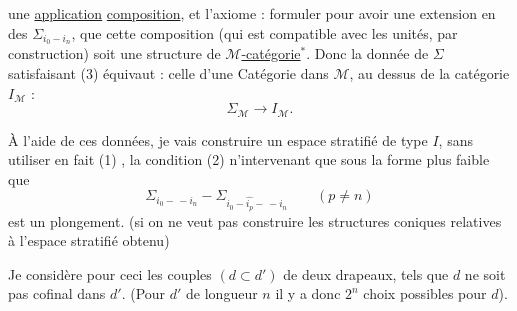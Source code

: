 une \uline{application} \uline{composition}, et l'axiome :
formuler pour avoir une extension 
en des \(\Sigma_{i_0-i_n}\),  que cette composition
(qui est compatible avec les unités, \unsure{,|)}
par construction) soit une structure de
\uline{\(\mathcal M\)-catégorie}\(^*\). 
Donc la donnée de \(\Sigma\) satisfaisant (3)
équivaut : celle d'une Catégorie dans \(\mathcal M\),
au dessus de la catégorie \(I_{\mathcal M}\) :
\[
 \Sigma_{\mathcal M}\longrightarrow I_{\mathcal M}.
\]


À l'aide de ces données, je vais
construire un espace stratifié de type \(I\),
sans utiliser en fait 
(1) , la condition (2) n'intervenant
que sous la forme plus faible que
\[
 \Sigma_{i_0-\, -i_n}
 -\Sigma_{i_0-\widehat{i_p}-\, -i_n}\qquad(p\ne n)
\]
est un plongement. 
(si on ne veut pas construire les structures coniques
relatives à l'espace stratifié obtenu)

Je considère pour ceci les couples
 \((d\subset d')\) de deux drapeaux,
 tels que
\(d\)  ne soit pas cofinal dans \(d'\).
(Pour \(d'\) 
de longueur \(n\)
il y a donc \(2^n\) choix possibles pour \(d\)).

